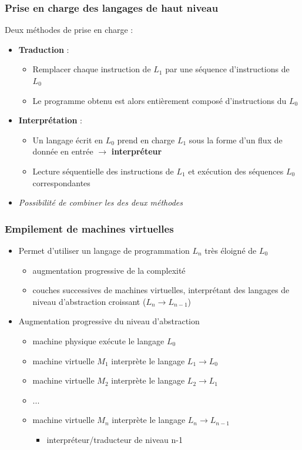 \begin{frame}
\frametitle{Prise en charge des langages de haut niveau}
Deux méthodes de prise en charge :
\begin{itemize}
\item \textbf{Traduction} : 
\begin{itemize}
\item Remplacer chaque instruction de $L_1$ par une séquence d'instructions de $L_0$
\item Le programme obtenu est alors entièrement composé d'instructions du $L_0$
\end{itemize}

\item \textbf{Interprétation} : 
\begin{itemize}
\item Un langage écrit en $L_0$ prend en charge $L_1$ sous la forme d'un flux de donnée en entrée $\rightarrow$ \textbf{interpréteur}
\item Lecture séquentielle des instructions de $L_1$ et exécution des séquences $L_0$ correspondantes
\end{itemize}
\item \textit{Possibilité de combiner les des deux méthodes} \cite{tanen} 
\end{itemize}
\end{frame}

\begin{frame}
\frametitle{Empilement de machines virtuelles}
\begin{itemize}
\item Permet d'utiliser un langage de programmation $L_n$ très éloigné de $L_0$
\begin{itemize}
\item augmentation progressive de la complexité
\item couches successives de machines virtuelles, interprétant des langages de niveau d'abstraction croissant ($L_n \rightarrow L_{n-1}$)
\end{itemize}

\item Augmentation progressive du niveau d'abstraction
\begin{itemize}
\item machine physique exécute le langage $L_0$ 
\item machine virtuelle $M_1$ interprète le langage $L_1 \rightarrow L_0$
\item machine virtuelle $M_2$ interprète le langage $L_2 \rightarrow L_1$
\item ...
\item machine virtuelle $M_n$ interprète le langage $L_n \rightarrow L_{n-1}$
\begin{itemize}
\item interpréteur/traducteur de niveau n-1
\end{itemize}
\end{itemize}
\end{itemize}
\end{frame}

